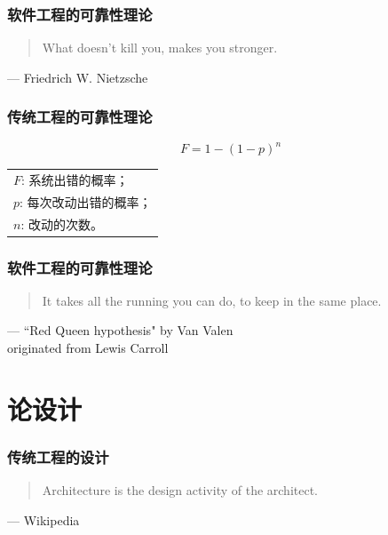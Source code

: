 \documentclass[UTF8,lualatex]{ctexbeamer}
\newcommand{\pagequote}[2]{
  \Large
  \begin{quotation}
      #1
  \end{quotation}
  \flushright\normalsize --- {#2}
}
\begin{document}
\begin{frame}
    \frametitle{软件工程的可靠性理论}
    \pagequote{What doesn't kill you, makes you stronger.}{Friedrich W. Nietzsche}
\end{frame}

\begin{frame}
    \frametitle{传统工程的可靠性理论}
    \[
    F=1-(1-p)^n
    \]
    \begin{center}
        \begin{tabu}{l}
            $F$: 系统出错的概率；\\
            $p$: 每次改动出错的概率；\\
            $n$: 改动的次数。
        \end{tabu}
    \end{center}
\end{frame}

\begin{frame}
    \frametitle{软件工程的可靠性理论}
    \pagequote{It takes all the running you can do, to keep in the same place.}
        {``Red Queen hypothesis" by Van Valen\\originated from Lewis Carroll}
\end{frame}

\section{论设计}

\begin{frame}
    \frametitle{传统工程的设计}
    \pagequote{Architecture is the design activity of the architect.}{Wikipedia}
\end{frame}
\end{document}
